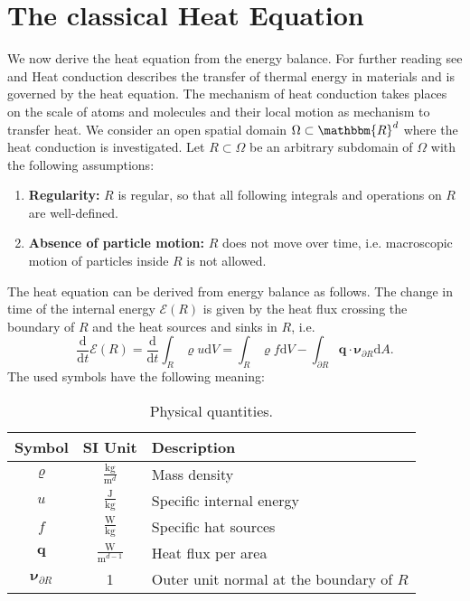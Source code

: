 \documentclass[a4paper,11pt]{article}
\begin{document}
\tableofcontents
\newpage

\section{The classical Heat Equation}
We now derive the heat equation from the energy balance. For further reading see \cite[pp 207]{eck2008modellierung} and \cite[pp 105]{hoffmann2014modellierung}
Heat conduction describes the transfer of thermal energy in materials and is governed by the heat equation. The mechanism of heat conduction takes places on the scale of atoms and molecules and their local motion as mechanism to transfer heat. 
We consider an open spatial domain $\Omega \subset \mathbbm{R}^d $ where the heat conduction is investigated. 
Let $R \subset \Omega $ be an arbitrary subdomain of $\Omega $ with the following assumptions:
\begin{enumerate}
\item \textbf{Regularity:} $R$ is regular, so that all following integrals and operations on $R$ are well-defined.
\item \textbf{Absence of particle motion:} $R$ does not move over time, i.e. macroscopic motion of particles inside $R$ is not allowed.
\end{enumerate}
The heat equation can be derived from energy balance as follows. The change in time of the internal energy $\mathscr{E}(R) $ is given by the heat flux crossing the boundary of $R$ and the heat sources and sinks in $R$, i.e.
\begin{equation*}
\frac{\mathrm{d}}{\mathrm{d}t} \mathscr{E} (R) = \frac{\mathrm{d}}{\mathrm{d}t} \int_R \varrho u \mathrm{d} V = \int_R \varrho f \mathrm{d} V - \int_{\partial R } \boldsymbol{q}\cdot \boldsymbol{\nu}_{\partial R} \mathrm{d} A .
\end{equation*}
The used symbols have the following meaning:
\begin{table}[h!] 
\centering
{\renewcommand{\arraystretch}{1.4}
\begin{tabular}{ccl}
\toprule
\textbf{Symbol} & \textbf{SI Unit} & \textbf{Description}\\
\midrule
$\varrho$ & $\tfrac{\mathrm{kg}}{\mathrm{m}^d}$ & Mass density \\
$u $ & $\tfrac{\mathrm{J}}{\mathrm{kg}}$ & Specific internal energy \\
$f$ & $\tfrac{\mathrm{W}}{\mathrm{kg}}$ & Specific hat sources \\
$\boldsymbol{q}$ & $\tfrac{\mathrm{W}}{\mathrm{m}^{d-1}}$ & Heat flux per area\\
$\boldsymbol{\nu}_{\partial R}$ & 1 & Outer unit normal at the boundary of $R$\\
\bottomrule
\end{tabular}}
\caption{Physical quantities.}
\label{TablePhysicalQuantities}
\end{table}
\end{document}
